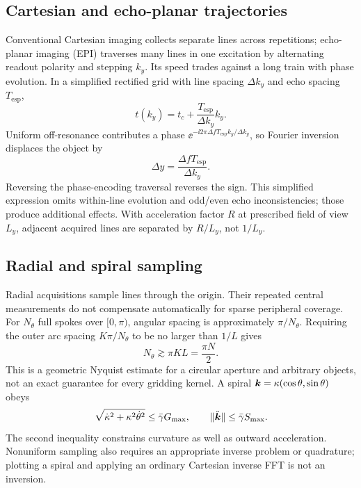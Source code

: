 \subsection{Cartesian and echo-planar trajectories}
Conventional Cartesian imaging collects separate lines across repetitions; echo-planar imaging (EPI) traverses many lines in one excitation by alternating readout polarity and stepping \(k_y\). Its speed trades against a long train with phase evolution. In a simplified rectified grid with line spacing \(\Delta k_y\) and echo spacing \(T_{\mathrm{esp}}\),
\[
 t(k_y)=t_c+\frac{T_{\mathrm{esp}}}{\Delta k_y}k_y.
\]
Uniform off-resonance contributes a phase
\(\ee^{-\ii2\pi\Delta f T_{\mathrm{esp}}k_y/\Delta k_y}\), so Fourier inversion displaces the object by
\begin{equation}
 \Delta y=\frac{\Delta f T_{\mathrm{esp}}}{\Delta k_y}.
 \label{eq:05:epi}
\end{equation}
Reversing the phase-encoding traversal reverses the sign. This simplified expression omits within-line evolution and odd/even echo inconsistencies; those produce additional effects. With acceleration factor \(R\) at prescribed field of view \(L_y\), adjacent acquired lines are separated by \(R/L_y\), not \(1/L_y\).

\subsection{Radial and spiral sampling}
Radial acquisitions sample lines through the origin. Their repeated central measurements do not compensate automatically for sparse peripheral coverage. For \(N_\theta\) full spokes over \([0,\pi)\), angular spacing is approximately \(\pi/N_\theta\). Requiring the outer arc spacing \(K\pi/N_\theta\) to be no larger than \(1/L\) gives
\begin{equation}
 N_\theta\gtrsim\pi KL=\frac{\pi N}{2}.
 \label{eq:05:radial}
\end{equation}
This is a geometric Nyquist estimate for a circular aperture and arbitrary objects, not an exact guarantee for every gridding kernel.
A spiral \(\bm{k}=\kappa(\cos\theta,\sin\theta)\) obeys
\[
 \sqrt{\dot\kappa^2+\kappa^2\dot\theta^2}\leq\bar{\gamma} G_{\max},
 \qquad \lVert\ddot{\bm{k}}\rVert\leq\bar{\gamma} S_{\max}.
\]
The second inequality constrains curvature as well as outward acceleration. Nonuniform sampling also requires an appropriate inverse problem or quadrature; plotting a spiral and applying an ordinary Cartesian inverse FFT is not an inversion.


